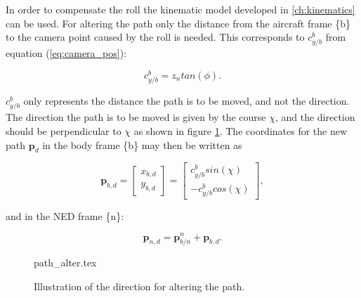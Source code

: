 In order to compensate the roll the kinematic model developed in \ref{ch:kinematics} can be used. For altering the path only the distance from the aircraft frame \{b\} to the camera point caused by the roll is needed. This corresponds to $c_{y/b}^b$ from equation (\ref{eq:camera_pos}):

\begin{equation}
	\label{eq:roll_impact}
	c_{y/b}^b = z_ntan(\phi).
\end{equation}

$c_{y/b}^b$ only represents the distance the path is to be moved, and not the direction. The direction the path is to be moved is given by the course $\chi$, and the direction should be perpendicular to $\chi$ as shown in figure \ref{fig:path_alter_dir}. The coordinates for the new path $\bm{p}_d$ in the body frame \{b\} may then be written as

\begin{equation}
	\bm{p}_{b,d} =
	\begin{bmatrix}
		x_{b,d} \\ y_{b,d}
	\end{bmatrix}
	=
	\begin{bmatrix}
		c_{y/b}^b sin(\chi) \\
		-c_{y/b}^b cos(\chi)
	\end{bmatrix},
\end{equation}

and in the NED frame \{n\}:

\begin{equation}
	\bm{p}_{n,d} = \bm{p}_{b/n}^n + \bm{p}_{b,d}.
\end{equation}

\begin{figure}[]
    {path_alter.tex}
    \caption{Illustration of the direction for altering the path.}
	\label{fig:path_alter_dir}
\end{figure}